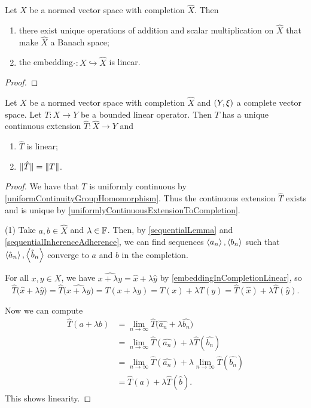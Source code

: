 \begin{lemma} \label{embeddingInCompletionLinear}
Let $X$ be a normed vector space with completion $\hat{X}$. Then
\begin{enumerate}
\item there exist unique operations of addition and scalar multiplication on $\hat{X}$ that make $\hat{X}$ a Banach space;
\item the embedding $\hat{}: X \hookrightarrow \hat{X}$ is linear.
\end{enumerate}
\end{lemma}
\begin{proof}

\end{proof}


\begin{proposition}
Let $X$ be a normed vector space with completion $\hat{X}$ and $\sSet{Y, \xi}$ a complete vector space. Let $T: X\to Y$ be a bounded linear operator. Then $T$ has a unique continuous extension $\hat{T}: \hat{X} \to Y$ and
\begin{enumerate}
\item $\hat{T}$ is linear;
\item $\lVert\hat{T}\rVert = \lVert T\rVert$.
\end{enumerate}
\end{proposition}
\begin{proof}
We have that $T$ is uniformly continuous by \ref{uniformContinuityGroupHomomorphism}. Thus the continuous extension $\hat{T}$ exists and is unique by \ref{uniformlyContinuousExtensionToCompletion}.

(1) Take $a,b\in \hat{X}$ and $\lambda \in \mathbb{F}$. Then, by \ref{sequentialLemma} and \ref{sequentialInherenceAdherence}, we can find sequences $\left\langle a_n \right\rangle, \left\langle b_n \right\rangle$ such that $\left\langle \hat{a}_n \right\rangle, \left\langle \hat{b}_n \right\rangle$ converge to $a$ and $b$ in the completion.

For all $x,y\in X$, we have $\widehat{x+\lambda y} = \hat{x} + \lambda \hat{y}$ by \ref{embeddingInCompletionLinear}, so
\[ \hat{T}\big(\hat{x} + \lambda \hat{y}\big) = \hat{T}\big(\widehat{x+\lambda y}\big) = T(x+\lambda y) = T(x) + \lambda T(y) = \hat{T}(\hat{x}) + \lambda \hat{T}(\hat{y}). \]

Now we can compute
\begin{align*}
\hat{T}(a+ \lambda b) &= \lim_{n\to \infty}\hat{T}\big(\hat{a_n} + \lambda \hat{b_n}\big) \\
&= \lim_{n\to \infty}\hat{T}(\hat{a_n}) + \lambda \hat{T}(\hat{b_n}) \\
&= \lim_{n\to \infty}\hat{T}(\hat{a_n}) + \lambda \lim_{n\to \infty}\hat{T}(\hat{b_n}) \\
&= \hat{T}(a) + \lambda \hat{T}(\hat{b}).
\end{align*}
This shows linearity.
\end{proof}


